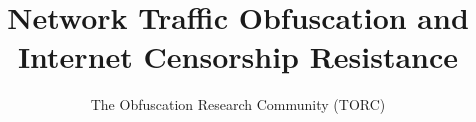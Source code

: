 \documentclass[10pt]{article}
\begin{document}

\title{Network Traffic Obfuscation and Internet Censorship Resistance}

\author{The Obfuscation Research Community (TORC)}

\maketitle



\newpage
\tableofcontents
\newpage








\end{document}
